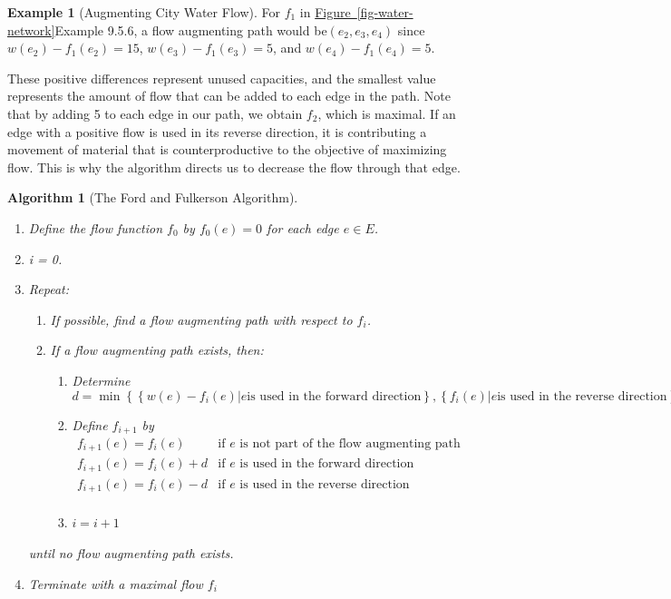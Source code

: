 \documentclass[10pt,]{book}
\theoremstyle{plain}
\newtheorem{algorithm}[theorem]{Algorithm}
\theoremstyle{definition}
\theoremstyle{definition}
\theoremstyle{definition}
\newtheorem{example}[theorem]{Example}
\theoremstyle{definition}
\theoremstyle{definition}
\numberwithin{equation}{section}
\begin{document}
\begin{example}[Augmenting City Water Flow]\label{example-water-augmenting}
For \(f_1\) in \hyperref[fig-water-network]{Figure~\ref{fig-water-network}}Example 9.5.6, a flow augmenting path would be\(\left(e_2 , e_3 , e_4 \right)\) since
\(w\left(e_2\right)-f_1\left(e_2\right)= 15\), \(w\left(e_3\right)-f_1\left(e_3\right)=5\), and \(w\left(e_4\right)-f_1\left(e_4\right)=5\).%
\par
These positive differences represent unused capacities, and the smallest value represents the amount of flow that can be added to each edge in the path. Note that by adding 5 to each edge in our path, we obtain \(f_2\), which is maximal. If an edge with a positive flow is used in its reverse direction, it is contributing a movement of material that is counterproductive to the objective of maximizing flow. This is why the
algorithm directs us to decrease the flow through that edge.%
\end{example}
\begin{algorithm}[The Ford and Fulkerson Algorithm]\label{alg-ford-fulkerson}
\leavevmode%
\begin{enumerate}[label=\arabic*]
\item\hypertarget{li-80}{} Define the flow function \(f_0\) by \(f_0(e)=0\) for each edge \(e \in  E\).%
\item\hypertarget{li-81}{}i = 0.%
\item\hypertarget{li-82}{}Repeat:%
\par
%
\begin{enumerate}[label=\alph*]
\item\hypertarget{li-83}{}If possible, find a flow augmenting path with respect to \(f_i\).%
\item\hypertarget{li-84}{}If a flow augmenting path exists, then:%
\par
%
\begin{enumerate}[label=\roman*]
\item\hypertarget{li-85}{}Determine
		   \[d = \min  \left\{\left\{\left.w(e) - f_i(e) \right| e \text{is used in the forward direction}\right\},\left\{\left.f_i(e) \right| e \text{is used in the reverse direction}\right\}\right\}\]%
\item\hypertarget{li-86}{}Define \(f_{i+1}\) by \[\begin{array}{cc}
 f_{i+1}(e) = f_i(e) &  \text{if } e \text{ is not part of the flow augmenting path} \\
 f_{i+1}(e)=f_i(e)+d & \text{if } e \text{ is used in the forward direction} \\
 f_{i+1}(e)=f_i(e)-d & \text{if } e \text{ is used in the reverse direction} \\
\end{array}\]%
\item\hypertarget{li-87}{} \(i = i + 1\)%
\end{enumerate}
%
\end{enumerate}
%
\par
 until no flow augmenting path exists.%
\item\hypertarget{li-88}{}Terminate with a maximal flow \(f_i\)%
\end{enumerate}
%
\end{algorithm}
\end{document}
